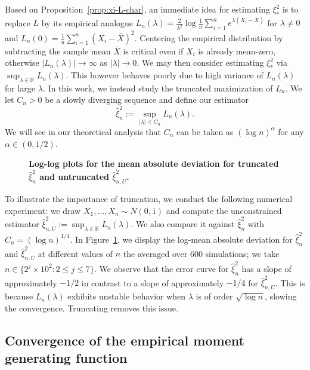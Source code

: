 \documentclass{article}
\theoremstyle{definition}
\newcommand{\R}{\mathbb{R}}
\newcommand{\1}{\mathbbm{1}}
\begin{document}
Based on Proposition~\ref{prop:xi-L-char}, an immediate idea for estimating $\xi_*^2$ is to replace $L$ by its empirical analogue $L_n(\lambda) = \frac{2}{\lambda^2} \log \frac{1}{n}\sum_{i=1}^n e^{\lambda (X_i - \bar{X})}$ for $\lambda \neq 0$ and $L_n(0) = \frac{1}{n} \sum_{i=1}^n (X_i - \bar{X})^2$. Centering the empirical distribution by subtracting the sample mean $\bar{X}$ is critical even if $X_i$ is already mean-zero, otherwise $|L_n(\lambda)| \rightarrow \infty$ as $|\lambda| \rightarrow 0$. We may then consider estimating $\xi_*^2$ via $\sup_{\lambda \in \mathbb{R}} L_n(\lambda)$.  This however behaves poorly due to high variance of $L_n(\lambda)$ for large $\lambda$. In this work, we instead study the truncated maximization of $L_n$. We let $C_n > 0$ be a slowly diverging sequence and define our estimator
\[
\hat{\xi}_n^2 := \sup_{|\lambda| \leq C_n} L_n(\lambda). 
\]
We will see in our theoretical analysis that $C_n$ can be taken as $(\log n)^\alpha$ for any $\alpha \in (0, 1/2)$. 


\begin{figure}
    \centering
    \resizebox{0.6\linewidth}{!}{}
    \caption{\textbf{Log-log plots for the mean absolute deviation for truncated $\hat \xi^2_n$ and untruncated $\hat \xi^2_{n, U}$.} }
   \label{fig:trunc-untrunc-comparison}
\end{figure}


To illustrate the importance of truncation, we conduct the following numerical experiment: we draw $X_1, \dots, X_n \sim N(0, 1)$ and compute the unconstrained estimator 
$\hat \xi_{n, U}^{2} := \sup_{\lambda \in \R} L_n(\lambda)$. We also compare it against $\hat \xi_n^2$ with $C_n = (\log n)^{1/4}$. In Figure~\ref{fig:trunc-untrunc-comparison}, we display the log-mean absolute deviation for $\hat \xi_n^2$ and $\hat \xi^2_{n, U}$ at different values of $n$ the averaged over 600 simulations; we take $n \in \{2^{j} \times 10^{2}: 2 \leq j \leq 7\}$. We observe that the error curve for $\hat \xi_n^2$ has a slope of approximately $-1/2$ in contrast to a slope of approximately $-1/4$ for $\hat \xi_{n, U}^2$. This is because $L_n(\lambda)$ exhibits unstable behavior when $\lambda$ is of order $\sqrt{\log n}$, slowing the convergence. Truncating removes this issue. 

\subsection{Convergence of the empirical moment generating function}
\end{document}
